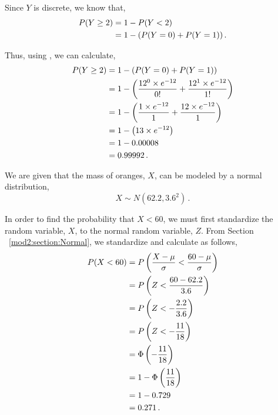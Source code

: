 \begin{subquestions}
\begin{subsubquestions}
Since $Y$ is discrete, we know that,
\begin{align}
	P(Y \geq 2) & = 1 - P(Y<2) \nonumber \\
	            & = 1 - (P(Y=0) + P(Y=1)) \,.
\end{align}

Thus, using , we can calculate,
\begin{align}
	P(Y \geq 2) & = 1 - (P(Y=0) + P(Y=1)) \nonumber \\
	            & = 1 - \left(\frac{12^{0} \times e^{-12}}{0!} + \frac{12^{1} \times e^{-12}}{1!} \right) \nonumber \\
	            & = 1 - \left(\frac{1 \times e^{-12}}{1} + \frac{12 \times e^{-12}}{1} \right) \nonumber \\
	            & = 1 - \left(13 \times e^{-12} \right) \nonumber \\
	            & = 1 - 0.00008 \nonumber \\
	            & = 0.99992\,.
\end{align}

\end{subsubquestions}

	
\subquestion

We are given that the mass of oranges, $X$, can be modeled by a normal distribution,
\begin{equation}
	X \sim N(62.2, 3.6^2) \,.
\end{equation}

\begin{subsubquestions}
	
\subsubquestion

In order to find the probability that $X<60$, we must first standardize the random variable, $X$, to the normal random variable, $Z$. From Section ~\ref{mod2:section:Normal}, we standardize and calculate as follows,
\begin{align}
	P (X<60) & = P\left(\frac{X - \mu}{\sigma} < \frac{60 - \mu}{\sigma} \right) \nonumber \\
	         & = P\left(Z < \frac{60-62.2}{3.6} \right) \nonumber \\
	         & = P\left(Z < -\frac{2.2}{3.6} \right) \nonumber \\	
	         & = P\left(Z < -\frac{11}{18} \right) \nonumber \\
	         & = \Phi\left(-\frac{11}{18} \right) \nonumber \\
	         & = 1 - \Phi\left(\frac{11}{18} \right) \nonumber \\
	         & = 1 - 0.729 \nonumber \\
	         & = 0.271 \,.	
\end{align}
	

\end{subsubquestions}
\end{subquestions}
